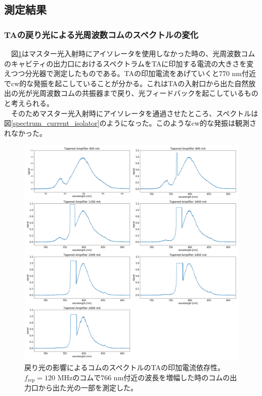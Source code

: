 \documentclass[uplatex, dvipdfmx, a4paper, report, papersize, 11pt]{jsbook}
\begin{document}
\subsection{測定結果}
\subsubsection{TAの戻り光による光周波数コムのスペクトルの変化}
　図\ref{spectrum_current_MODORI}はマスター光入射時にアイソレータを使用しなかった時の、光周波数コムのキャビティの出力口におけるスペクトラムをTAに印加する電流の大きさを変えつつ分光器で測定したものである。TAの印加電流をあげていくと$770$ nm付近でcw的な発振を起こしていることが分かる。これはTAの入射口から出た自然放出の光が光周波数コムの共振器まで戻り、光フィードバックを起こしているものと考えられる。\\
　そのためマスター光入射時にアイソレータを通過させたところ、スペクトルは図\ref{spectrum_current_isolator}のようになった。このようなcw的な発振は観測されなかった。
\begin{figure}[H]
 \begin{center}
  \includegraphics[width=140mm]{figures/chapter4/spectrum_current_MODORI.png}
\end{center}
 \caption{戻り光の影響によるコムのスペクトルのTAの印加電流依存性。$f_{\mathrm{rep}} = 120$ MHzのコムで$766$ nm付近の波長を増幅した時のコムの出力口から出た光の一部を測定した。}
 \label{spectrum_current_MODORI}
\end{figure}
\end{document}
